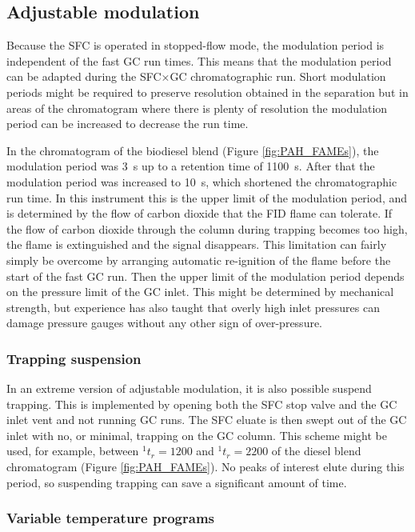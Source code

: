 \subsection{Adjustable modulation}

Because the SFC is operated in stopped-flow mode, the modulation period is
independent of the fast GC run times. This means that the modulation period can
be adapted during the SFC×GC chromatographic run. Short modulation periods might
be required to preserve resolution obtained in the \oneD separation but in areas
of the chromatogram where there is plenty of resolution the modulation period
can be increased to decrease the run time.

In the chromatogram of the biodiesel blend (Figure \ref{fig:PAH_FAMEs}), the
modulation period was \SI{3}{\second} up to a \oneD retention time of
\SI{1100}{s}. After that the modulation period was increased to
\SI{10}{\second}, which shortened the chromatographic run time. In this
instrument this is the upper limit of the modulation period, and is determined
by the flow of carbon dioxide that the FID flame can tolerate. If the flow of
carbon dioxide through the column during trapping becomes too high, the flame is
extinguished and the signal disappears. This limitation can fairly simply be
overcome by arranging automatic re-ignition of the flame before the start of the
fast GC run. Then the upper limit of the modulation period depends on the
pressure limit of the GC inlet. This might be determined by mechanical
strength, but experience has also taught that overly high inlet pressures can
damage pressure gauges without any other sign of over-pressure.

\subsubsection{Trapping suspension}

In an extreme version of adjustable modulation, it is also possible  suspend
trapping. This is implemented by opening both the SFC stop valve and the GC
inlet vent and not running GC runs. The SFC eluate is then swept out of the GC
inlet with no, or minimal, trapping on the GC column. This scheme might be used,
for example, between \(^{1}t_r = 1200\) and \(^{1}t_r = 2200\) of the diesel
blend chromatogram (Figure \ref{fig:PAH_FAMEs}). No peaks of interest elute
during this period, so suspending trapping can save a significant amount of
time.

\subsubsection{Variable temperature programs}

